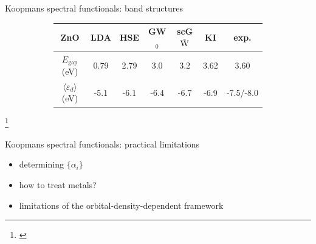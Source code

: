 \documentclass[xcolor=table,aspectratio=169]{beamer}
\newcommand\blfootcite[1]{%
  \begingroup
  \renewcommand\thefootnote{}\footnote{\hspace{-4ex}\cite{#1}}%
  \addtocounter{footnote}{-1}%
  \endgroup
}
\numberwithin{equation}{section}
\begin{document}
\begin{frame}{\normalsize Koopmans spectral functionals: band structures}
\begin{figure}[t]
\begin{subfigure}{0.3\textwidth}
      \end{subfigure}
      \begin{subfigure}{\textwidth} %
         \begin{tabularx}{\columnwidth}{C C C C C C C}
            ZnO                                  & LDA  & HSE  & GW$_0$ & scG$\tilde{\rm W}$ & KI   & exp.      \\
            \hline
            $E_\mathrm{gap}$ (eV)                & 0.79 & 2.79 & 3.0    & 3.2                & 3.62 & 3.60      \\
            $\langle \varepsilon_d \rangle$ (eV) & -5.1 & -6.1 & -6.4   & -6.7               & -6.9 & -7.5/-8.0 \\
         \end{tabularx}
      \end{subfigure}
   \end{figure}
   \blfootcite{Colonna2021}
\end{frame}

\begin{frame}{\small Koopmans spectral functionals: practical limitations}
   \begin{itemize}
      \item determining $\{\alpha_i\}$
      \item how to treat metals?
      \item limitations of the orbital-density-dependent framework
   \end{itemize}
\end{frame}
\end{document}
